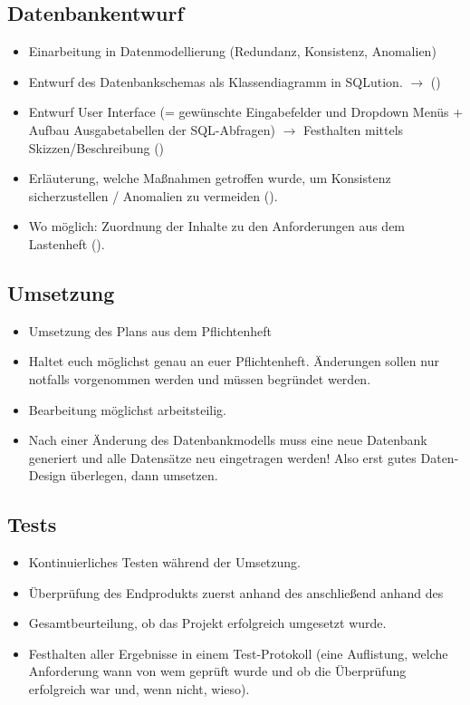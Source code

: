 {\subsection{Datenbankentwurf}
\begin{itemize}
    \item Einarbeitung in Datenmodellierung (Redundanz, Konsistenz, Anomalien)
    \item Entwurf des Datenbankschemas als Klassendiagramm in SQLution.
    $\rightarrow$  ()
    \item Entwurf User Interface (= gewünschte Eingabefelder und Dropdown Menüs + Aufbau Ausgabetabellen der SQL-Abfragen)
    $\rightarrow$ Festhalten mittels Skizzen/Beschreibung ()
    \item Erläuterung, welche Maßnahmen getroffen wurde, um Konsistenz sicherzustellen / Anomalien zu vermeiden ().
    \item Wo möglich: Zuordnung der Inhalte zu den Anforderungen aus dem Lastenheft ().
\end{itemize}

\subsection{Umsetzung}
\begin{itemize}
    \item Umsetzung des Plans aus dem Pflichtenheft
    \item Haltet euch möglichst genau an euer Pflichtenheft. Änderungen sollen nur notfalls vorgenommen werden und müssen begründet werden.
    \item Bearbeitung möglichst arbeitsteilig.
    \item {} Nach einer Änderung des Datenbankmodells muss eine neue Datenbank generiert und alle Datensätze neu eingetragen werden! Also erst gutes Daten-Design überlegen, dann umsetzen.
\end{itemize}

\subsection{Tests}
\begin{itemize}
    \item Kontinuierliches Testen während der Umsetzung.
    \item Überprüfung des Endprodukts zuerst anhand des  anschließend anhand des 
    \item Gesamtbeurteilung, ob das Projekt erfolgreich umgesetzt wurde.
    \item Festhalten aller Ergebnisse in einem Test-Protokoll (eine Auflistung, welche Anforderung wann von wem geprüft wurde und ob die Überprüfung erfolgreich war und, wenn nicht, wieso).
\end{itemize}

}

